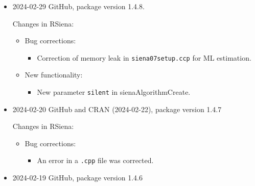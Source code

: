 \documentclass[a4paper,fleqn,11pt]{article}
\newcommand{\+}{\, + \,}
\newcommand{\sfn}[1]{\textsf{#1}}
\begin{document}
\begin{small}
\begin{itemize}
\item 2024-02-29 GitHub, package version 1.4.8.


Changes in RSiena:
\begin{itemize}
\item Bug corrections:
   \begin{itemize}
   \item Correction of memory leak in \texttt{siena07setup.ccp} for ML estimation.
    \end{itemize}
\item New functionality:
   \begin{itemize}
   \item New parameter \texttt{silent} in \sfn{sienaAlgorithmCreate}.
    \end{itemize}
\end{itemize}


\item 2024-02-20 GitHub and CRAN (2024-02-22), package version 1.4.7

Changes in RSiena:
\begin{itemize}
\item Bug corrections:
   \begin{itemize}
   \item An error in a \texttt{.cpp} file was corrected.
  \end{itemize}
\end{itemize}


\item 2024-02-19 GitHub, package version 1.4.6


\end{itemize}
\end{small}
\end{document}
